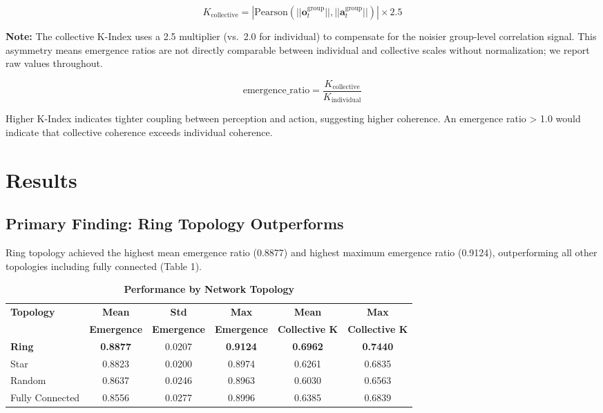 \documentclass[10pt,letterpaper]{article}
\begin{document}
\begin{equation}
K_{\text{collective}} = |\text{Pearson}(||\mathbf{o}^{\text{group}}_t||, ||\mathbf{a}^{\text{group}}_t||)| \times 2.5
\end{equation}

\textbf{Note:} The collective K-Index uses a 2.5 multiplier (vs.\ 2.0 for individual) to compensate for the noisier group-level correlation signal. This asymmetry means emergence ratios are not directly comparable between individual and collective scales without normalization; we report raw values throughout.

\begin{equation}
\text{emergence\_ratio} = \frac{K_{\text{collective}}}{K_{\text{individual}}}
\end{equation}

Higher K-Index indicates tighter coupling between perception and action, suggesting higher coherence. An emergence ratio > 1.0 would indicate that collective coherence exceeds individual coherence.

\section*{Results}

\subsection*{Primary Finding: Ring Topology Outperforms}
Ring topology achieved the highest mean emergence ratio (0.8877) and highest maximum emergence ratio (0.9124), outperforming all other topologies including fully connected (Table 1).

\begin{table}[h]
\caption{\textbf{Performance by Network Topology}}
\begin{tabular}{lccccc}
\hline
\textbf{Topology} & \textbf{Mean} & \textbf{Std} & \textbf{Max} & \textbf{Mean} & \textbf{Max} \\
 & \textbf{Emergence} & \textbf{Emergence} & \textbf{Emergence} & \textbf{Collective K} & \textbf{Collective K} \\
\hline
\textbf{Ring} & \textbf{0.8877} & 0.0207 & \textbf{0.9124} & \textbf{0.6962} & \textbf{0.7440} \\
Star & 0.8823 & 0.0200 & 0.8974 & 0.6261 & 0.6835 \\
Random & 0.8637 & 0.0246 & 0.8963 & 0.6030 & 0.6563 \\
Fully Connected & 0.8556 & 0.0277 & 0.8996 & 0.6385 & 0.6839 \\
\hline
\end{tabular}
\label{tab:topology}
\end{table}
\end{document}
